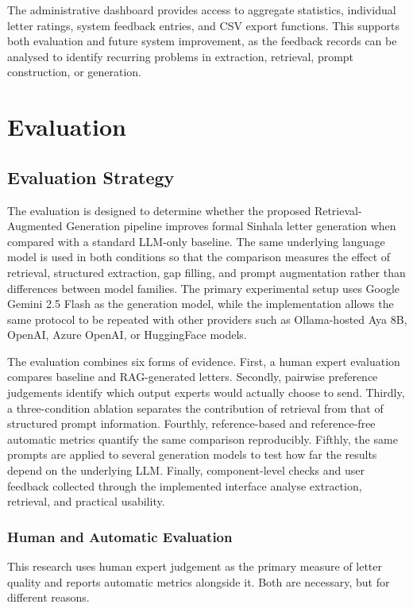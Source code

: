 \documentclass[12pt]{uomthesis}
\begin{document}
The administrative dashboard provides access to aggregate statistics, individual letter ratings, system feedback entries, and CSV export functions. This supports both evaluation and future system improvement, as the feedback records can be analysed to identify recurring problems in extraction, retrieval, prompt construction, or generation.

\chapter{Evaluation}

\section{Evaluation Strategy}

The evaluation is designed to determine whether the proposed Retrieval-Augmented Generation pipeline improves formal Sinhala letter generation when compared with a standard LLM-only baseline. The same underlying language model is used in both conditions so that the comparison measures the effect of retrieval, structured extraction, gap filling, and prompt augmentation rather than differences between model families. The primary experimental setup uses Google Gemini 2.5 Flash as the generation model, while the implementation allows the same protocol to be repeated with other providers such as Ollama-hosted Aya 8B, OpenAI, Azure OpenAI, or HuggingFace models.

The evaluation combines six forms of evidence. First, a human expert evaluation compares baseline and RAG-generated letters. Secondly, pairwise preference judgements identify which output experts would actually choose to send. Thirdly, a three-condition ablation separates the contribution of retrieval from that of structured prompt information. Fourthly, reference-based and reference-free automatic metrics quantify the same comparison reproducibly. Fifthly, the same prompts are applied to several generation models to test how far the results depend on the underlying LLM. Finally, component-level checks and user feedback collected through the implemented interface analyse extraction, retrieval, and practical usability.

\subsection{Human and Automatic Evaluation}

This research uses human expert judgement as the primary measure of letter quality and reports automatic metrics alongside it. Both are necessary, but for different reasons.
\end{document}
